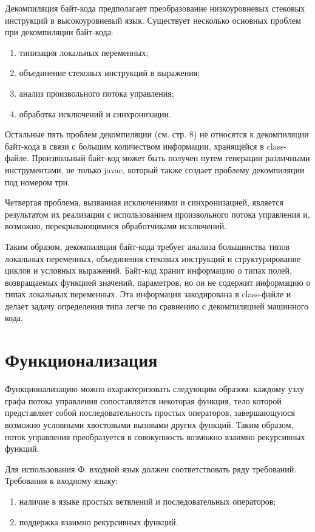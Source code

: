 \documentclass[14pt]{extarticle}
\begin{document}
\pagebreak

Декомпиляция байт-кода предполагает преобразование низкоуровневых стековых инструкций в высокоуровневый язык. Существует несколько основных проблем при декомпиляции байт-кода:

\begin{enumerate}
\item типизация локальных переменных;
\item объединение стековых инструкций в выражения;
\item анализ произвольного потока управления;
\item обработка исключений и синхронизации.
\end{enumerate}

Остальные пять проблем декомпиляции (см. стр. 8) не относятся к декомпиляции байт-кода в связи с большим количеством информации, хранящейся в class-файле. Произвольный байт-код может быть получен путем генерации различными инструментами, не только javac, который также создает проблему декомпиляции под номером три.

Четвертая проблема, вызванная исключениями и синхронизацией, является результатом их реализации с использованием произвольного потока управления и, возможно, перекрывающимися обработчиками исключений.

Таким образом, декомпиляция байт-кода требует анализа большинства типов локальных переменных, объединения стековых инструкций  и структурирование циклов и условных выражений. Байт-код хранит информацию о типах полей, возвращаемых функцией значений, параметров, но он не содержит информацию о типах локальных переменных. Эта информация закодирована в class-файле и делает задачу определения типа легче по сравнению с декомпиляцией машинного кода.

\pagebreak
\section{Функционализация}

Функционализацию\cite{ssa} можно охарактеризовать следующим образом: каждому узлу графа потока управления сопоставляется некоторая функция, тело которой представляет собой последовательность простых операторов, завершающуюся возможно условными хвостовыми вызовами других функций. Таким образом, поток управления преобразуется в совокупность возможно взаимно рекурсивных функций. 

Для использования Ф. входной язык должен соответствовать ряду требований.
Требования к входному языку:
\begin{enumerate}
\item наличие в языке простых ветвлений и последовательных операторов;
\item поддержка взаимно рекурсивных функций.
\end{enumerate}
\end{document}
